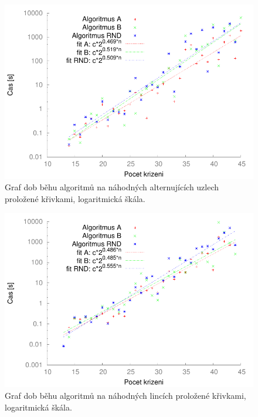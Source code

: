 \begin{figure}[p]\centering
\includegraphics{../img/alt_knotsFIT}
\caption{Graf dob běhu algoritmů na náhodných alternujících uzlech proložené křivkami, logaritmická škála.}
\label{obr03:altSrov}
\end{figure}

\begin{figure}[t]\centering
\includegraphics{../img/linksFIT}
\caption{Graf dob běhu algoritmů na náhodných lincích proložené křivkami, logaritmická škála.}
\label{obr03:linkSrov}
\end{figure}



